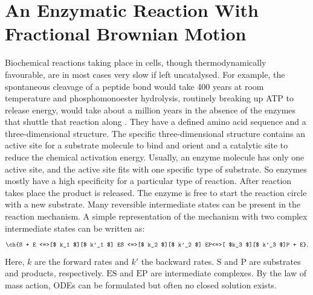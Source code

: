 \documentclass[
  a4paper,BCOR10mm,twoside,
  headsepline,footsepline,%
  fleqn,openbib
]{scrbook}
\begin{document}
\chapter{An Enzymatic Reaction With Fractional Brownian Motion}

Biochemical reactions taking place in cells, though thermodynamically favourable, are in most cases very slow if left uncatalysed. For example, the spontaneous cleavage of a peptide bond would take 400 years at room temperature and phosphomonoester hydrolysis, routinely breaking up ATP to release energy, would take about a million years in the absence of the enzymes that shuttle that reaction along \cite{Wolfenden2001}. They have a defined amino acid sequence and a three-dimensional structure. The specific three-dimensional structure contains an active site for a substrate molecule to bind and orient and a catalytic site to reduce the chemical activation energy. Usually, an enzyme molecule has only one active site, and the active site fits with one specific type of substrate. So enzymes mostly have a high specificity for a particular type of reaction.  After reaction takes place the product is released. The enzyme is free to start the reaction circle with a new substrate. Many reversible intermediate states can be present in the reaction mechanism. A simple representation of the mechanism with two complex intermediate states can be written as:
\begin{align} \label{eq:enyzmescheme}
\ch{S + E <=>[$ k_1 $][$ k'_1 $] ES <=>[$ k_2 $][$ k'_2 $] EP<=>[ $k_3 $][$ k'_3 $]P + E} ,
\end{align}
Here, $k$ are the forward rates and $k'$ the backward rates. $\mathrm{S}$ and $\mathrm{P}$ are substrates and products, respectively. $\mathrm{ES}$ and $\mathrm{EP}$ are intermediate complexes. By the law of mass action, ODEs can be formulated but often no closed solution exists.\par
\end{document}

